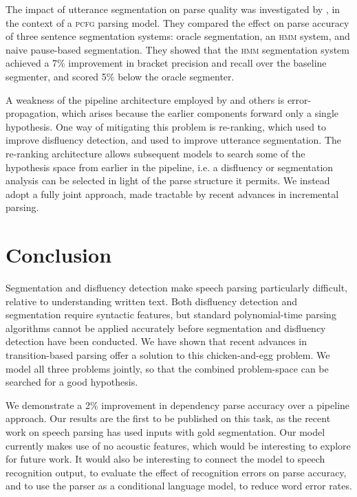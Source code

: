 \documentclass[11pt,letterpaper]{article}
\begin{document}
The impact of utterance segmentation on parse quality was investigated by
\citet{kahn:04}, in the context of a \textsc{pcfg} parsing model.  They compared
the effect on parse accuracy of three sentence segmentation systems: oracle segmentation,
an \textsc{hmm} system, and naive pause-based segmentation.  They showed that
the \textsc{hmm} segmentation system achieved a 7\% improvement in bracket
precision and recall over the baseline segmenter, and scored 5\% below the
oracle segmenter.

A weakness of the pipeline architecture employed by \citet{kahn:04} and others
is error-propagation, which arises because the earlier components forward only
a single hypothesis.  One way of mitigating this problem is re-ranking, which
\citet{Johnson04a,Johnson04b} used to improve disfluency detection, and
\citet{roark:06} used to improve utterance segmentation.  The re-ranking architecture
allows subsequent models to search some of the hypothesis space from earlier in the
pipeline, i.e. a disfluency or segmentation analysis can be selected in light
of the parse structure it permits.  We instead adopt a fully joint approach,
made tractable by recent advances in incremental parsing.

\section{Conclusion}

Segmentation and disfluency detection make speech parsing particularly
difficult, relative to understanding written text.  Both disfluency detection
and segmentation require syntactic features, but standard polynomial-time
parsing algorithms cannot be applied accurately before segmentation and disfluency
detection have been conducted.
We have shown that recent advances in transition-based parsing offer a solution
to this chicken-and-egg problem.  We model all three problems
jointly, so that the combined problem-space can be searched for a good
hypothesis. 

We demonstrate a 2\% improvement in dependency parse accuracy over a pipeline
approach.  Our results are the first to be published on this task, as the recent
work on speech parsing has used inputs with gold segmentation.  
Our model currently makes use of no acoustic features, which would be interesting
to explore for future work.  It would also be interesting to connect the model
to speech recognition output, to evaluate the effect of recognition errors on
parse accuracy, and to use the parser as a conditional language model, to reduce
 word error rates.



\end{document}
